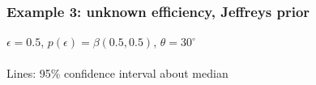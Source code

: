 \documentclass{beamer}
\begin{document}
\begin{frame}
\frametitle{Example 3: unknown efficiency, Jeffreys prior}
$\epsilon=0.5$, $p(\epsilon)=\beta(0.5,0.5)$, $\theta=30^{\circ}$\\~\\
Lines: 95\% confidence interval about median
\begin{figure}
    \centering
\end{figure}
\end{frame}
\end{document}
